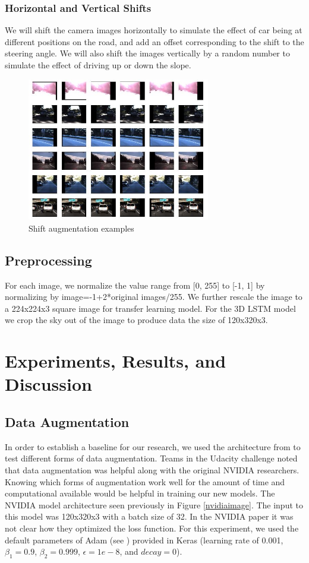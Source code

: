 \documentclass[10pt,twocolumn,letterpaper]{article}
\begin{document}
\subsubsection{Horizontal and Vertical Shifts}
We will shift the camera images horizontally to simulate the effect of car being at different positions on the road, and add an offset corresponding to the shift to the steering angle. We will also shift the images vertically by a random number to simulate the effect of driving up or down the slope.

\begin{figure}[!htb]
	\includegraphics[width=8cm]{shift_aug.JPG}
	\centering
	\caption{Shift augmentation examples}
	\label{shift_aug}
\end{figure}

\subsection{Preprocessing}
For each image, we normalize the value range from [0, 255] to [-1, 1] by normalizing by image=-1+2*original images/255. We further rescale the image to a 224x224x3 square image for transfer learning model. For the 3D LSTM model we crop the sky out of the image to produce data the size of 120x320x3.


\section{Experiments, Results, and Discussion}

\subsection{Data Augmentation}
In order to establish a baseline for our research, we used the architecture from \cite{bojarski2016end} to test different forms of data augmentation. Teams in the Udacity challenge noted that data augmentation was helpful along with the original NVIDIA researchers. Knowing which forms of augmentation work well for the amount of time and computational available would be helpful in training our new models. The NVIDIA model architecture seen previously in Figure \ref{nvidiaimage}. The input to this model was 120x320x3 with a batch size of 32. In the NVIDIA paper \cite{bojarski2016end} it was not clear how they optimized the loss function. For this experiment, we used the default parameters of Adam (see \cite{kingma2014adam}) provided in Keras (learning rate of 0.001, $\beta_{1}=0.9$, $\beta_{2}=0.999$, $\epsilon=1e-8$, and $decay=0$).
\end{document}
